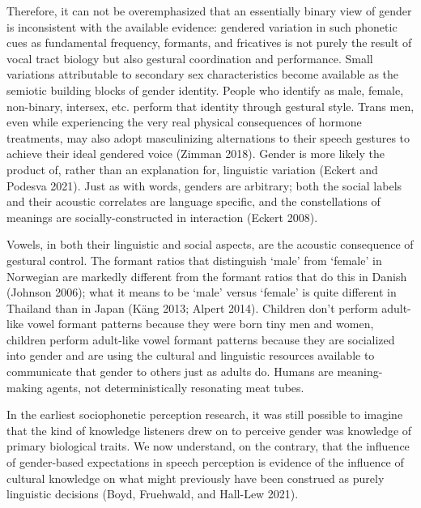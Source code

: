 \documentclass[
  letterpaper,
  DIV=11,
  numbers=noendperiod]{scrartcl}
\begin{document}
Therefore, it can not be overemphasized that an essentially binary view
of gender is inconsistent with the available evidence: gendered
variation in such phonetic cues as fundamental frequency, formants, and
fricatives is not purely the result of vocal tract biology but also
gestural coordination and performance. Small variations attributable to
secondary sex characteristics become available as the semiotic building
blocks of gender identity. People who identify as male, female,
non-binary, intersex, etc. perform that identity through gestural style.
Trans men, even while experiencing the very real physical consequences
of hormone treatments, may also adopt masculinizing alternations to
their speech gestures to achieve their ideal gendered voice (Zimman
2018). Gender is more likely the product of, rather than an explanation
for, linguistic variation (Eckert and Podesva 2021). Just as with words,
genders are arbitrary; both the social labels and their acoustic
correlates are language specific, and the constellations of meanings are
socially-constructed in interaction (Eckert 2008).

Vowels, in both their linguistic and social aspects, are the acoustic
consequence of gestural control. The formant ratios that distinguish
`male' from `female' in Norwegian are markedly different from the
formant ratios that do this in Danish (Johnson 2006); what it means to
be `male' versus `female' is quite different in Thailand than in Japan
(Käng 2013; Alpert 2014). Children don't perform adult-like vowel
formant patterns because they were born tiny men and women, children
perform adult-like vowel formant patterns because they are socialized
into gender and are using the cultural and linguistic resources
available to communicate that gender to others just as adults do. Humans
are meaning-making agents, not deterministically resonating meat tubes.

In the earliest sociophonetic perception research, it was still possible
to imagine that the kind of knowledge listeners drew on to perceive
gender was knowledge of primary biological traits. We now understand, on
the contrary, that the influence of gender-based expectations in speech
perception is evidence of the influence of cultural knowledge on what
might previously have been construed as purely linguistic decisions
(Boyd, Fruehwald, and Hall-Lew 2021).
\end{document}
